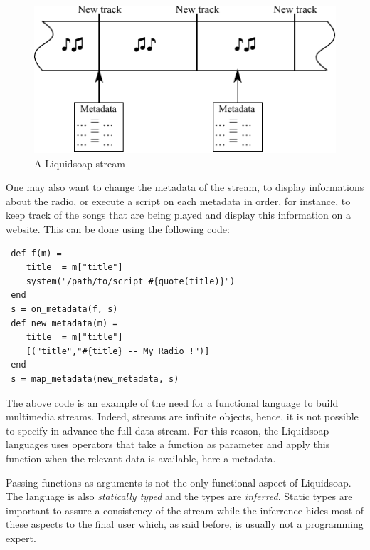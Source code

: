 \documentclass{llncs}
\newcommand{\liquidsoap}{Liquidsoap}
\begin{document}
\begin{figure}[htn]
 \begin{center}
\includegraphics{stream}
\end{center}
 \caption{A \liquidsoap{} stream}
\end{figure}

One may also want to change the metadata of the stream,
to display informations about the radio, or execute a script on each metadata 
in order, for instance, to keep track of the songs that are being played and 
display this information on a website. This can be done using the following code:
\begin{verbatim}
 def f(m) = 
    title  = m["title"]
    system("/path/to/script #{quote(title)}")
 end
 s = on_metadata(f, s)
 def new_metadata(m) = 
    title  = m["title"]
    [("title","#{title} -- My Radio !")]
 end
 s = map_metadata(new_metadata, s)
\end{verbatim}
The above code is an example of the need for a functional language to build multimedia 
streams. Indeed, streams are infinite objects, hence, it is not possible to specify in advance
the full data stream. For this reason, the \liquidsoap{} languages uses operators that take 
a function as parameter and apply this function when the relevant data is available, here 
a metadata.

Passing functions as arguments is not the only functional aspect of \liquidsoap{}. The language is 
also \textit{statically typed} and the types are \textit{inferred}. Static types are important to 
assure a consistency of the stream while the inferrence hides most of these aspects to 
the final user which, as said before, is usually not a programming expert.
\end{document}
